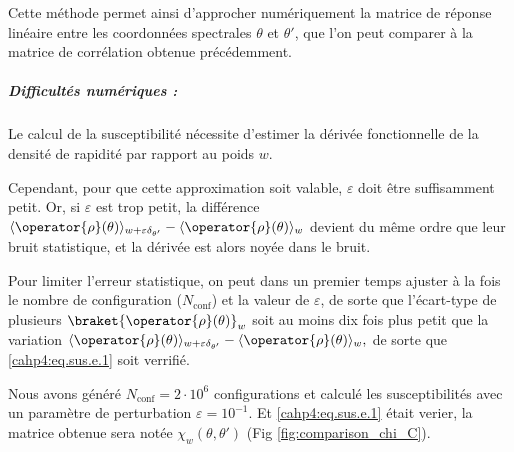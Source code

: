 Cette méthode permet ainsi d’approcher numériquement la matrice de réponse linéaire entre les coordonnées spectrales \( \theta \) et \( \theta' \), que l’on peut comparer à la matrice de corrélation obtenue précédemment.


\subparagraph{Difficultés numériques :}
Le calcul de la susceptibilité nécessite d’estimer la dérivée fonctionnelle de la densité de rapidité par rapport au poids \( w \). 

\medskip

Cependant, pour que cette approximation soit valable, \( \varepsilon \) doit être suffisamment petit. Or, si \( \varepsilon \) est trop petit, la différence  \( \langle \operator{\rho}(\theta) \rangle_{w + \varepsilon \delta_{\theta'}} -  \langle\operator{\rho} (\theta) \rangle_w \) devient du même ordre que leur bruit statistique, et la dérivée est alors noyée dans le bruit.

\medskip

Pour limiter l'erreur statistique, on peut dans un premier temps ajuster à la fois le nombre de configuration ($N_{\text{conf}}$) et la valeur de \( \varepsilon \), de sorte que l’écart-type de plusieurs \( \braket {\operator{\rho}(\theta)}_w \) soit au moins dix fois plus petit que la variation 
\(
\langle \operator{\rho}(\theta) \rangle_{w + \varepsilon \delta_{\theta'}} - \langle \operator{\rho}(\theta) \rangle_w,
\)
de sorte que \eqref{cahp4:eq.sus.e.1} soit verrifié.

\medskip



\medskip

Nous avons généré \( N_{\text{conf}} = 2 \cdot 10^6 \) configurations et calculé les susceptibilités avec un paramètre de perturbation \( \varepsilon = 10^{-1} \). Et \eqref{cahp4:eq.sus.e.1} était verier, la matrice obtenue sera notée $\chi_w(\theta, \theta')$ (Fig \ref{fig:comparison_chi_C}).

